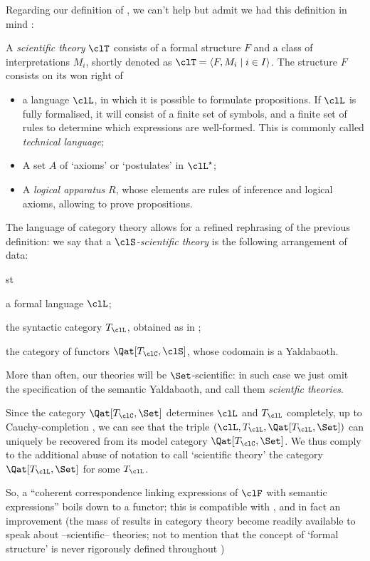 \documentclass[a4paper]{../birkjour}
\begin{document}
Regarding our definition of \science, we can't help but admit we had this definition in mind \cite[2.1]{biologia}:
\begin{definition}
  A \emph{scientific theory} $\clT$ consists of a formal structure $F$ and a class of interpretations $M_i$, shortly denoted as $\clT=\langle F,M_i\mid i\in I\rangle$. The structure $F$ consists on its won right of 
  \begin{itemize}
    \item a language $\clL$, in which it is possible to formulate propositions. If $\clL$ is fully formalised, it will consist of a finite set of symbols, and a finite set of rules to determine which expressions are well-formed. This is commonly called \emph{technical language};
    \item A set $A$ of `axioms' or `postulates' in $\clL^\star$;
    \item A \emph{logical apparatus} $R$, whose elements are rules of inference and logical axioms, allowing to prove propositions.
  \end{itemize}
\end{definition}
The language of category theory allows for a refined rephrasing of the previous definition: we say that a \emph{$\clS$-scientific theory} is the following arrangement of data:
\begin{enumtag}{st}
\item a formal language $\clL$;
\item the syntactic category $T_\clL$, obtained as in \cite{lambek1988introduction};
\item the category of functors $\Qat[T_\clC, \clS]$, whose codomain is a Yaldabaoth.
\end{enumtag}
More than often, our theories will be $\Set$-scientific: in such case we just omit the specification of the semantic Yaldabaoth, and call them \emph{scientfic theories}.

Since the category $\Qat[T_\clC, \Set]$ determines $\clL$ and $T_\clL$ completely, up to Cauchy-completion \cite{borceuso-cauchy}, we can see that the triple $(\clL, T_\clL, \Qat[T_\clL,\Set])$ can uniquely be recovered from its model category $\Qat[T_\clC, \Set]$. We thus comply to the additional abuse of notation to call `scientific theory' the category $\Qat[T_\clL,\Set]$ for some $T_\clL$.

So, a ``coherent correspondence linking expressions of $\clF$ with semantic expressions'' boils down to a functor; this is compatible with \cite[2.1]{biologia}, and in fact an improvement (the mass of results in category theory become readily available to speak about --scientific-- theories; not to mention that the concept of `formal structure' is never rigorously defined throughout \cite{biologia})
\end{document}
